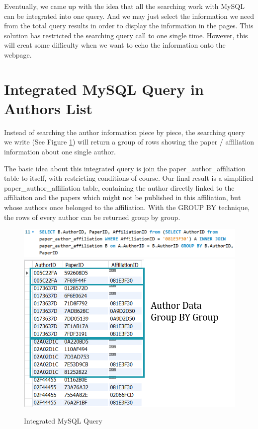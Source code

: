 \documentclass{book}
\begin{document}
Eventually, we came up with the idea that all the searching work with MySQL can be integrated into one query. And we may just select the information we need from the total query results in order to display the information in the pages. This solution has restricted the searching query call to one single time. However, this will creat some difficulty when we want to echo the information onto the webpage.

\section {Integrated MySQL Query in Authors List}

Instead of searching the author information piece by piece, the searching query we write (See Figure \ref{fig:opt_query}) will return a group of rows showing the paper / affiliation information about one single author.

The basic idea about this integrated query is join the paper\_author\_affiliation table to itself, with restricting conditions of course. Our final result is a simplified paper\_author\_affiliation table, containing the author directly linked to the affiliaiton and the papers which might not be published in this affiliation, but whose authors once belonged to the affiliation. With the GROUP BY technique, the rows of every author can be returned group by group.

\begin{figure}[H]
\centering
\includegraphics[scale=0.55]{img/zlt_opt_code_query.png}
\includegraphics[scale=0.55]{img/zlt_opt_code_queryres.png}
\caption{Integrated MySQL Query}
\label{fig:opt_query}
\end{figure}
\end{document}
